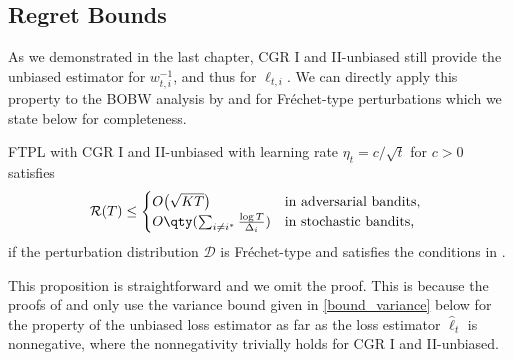 \subsection{Regret Bounds}
As we demonstrated in the last chapter, CGR I and II-unbiased still provide the unbiased estimator for $w_{t,i}^{-1}$, and thus for $\ell_{t,i}$.
We can directly apply this property to the BOBW analysis by \citet{pmlr-v201-honda23a} and \citet{pmlr-v247-lee24a}
for Fr\'{e}chet-type perturbations which we state below for completeness.
\begin{proposition}\label{prop_unbiased}
    FTPL with CGR I and II-unbiased with learning rate $\eta_t = c/\sqrt{t}$ for $c>0$ satisfies
\begin{align*}
\!\!\!
        \mathcal{R}(T) \leq \begin{cases}
            O\big(\sqrt{KT}\big)  &\text{in adversarial bandits,} \\
            O\qty(\sum_{i \ne i^*}\frac{\log T}{\Delta_i})& \text{in stochastic bandits,}
        \end{cases}
\end{align*}
if the perturbation distribution $\mathcal{D}$ is Fr\'echet-type and satisfies the conditions in \citet[Theorem 2]{pmlr-v247-lee24a}.
\end{proposition}
This proposition is straightforward and we omit the proof.
This is because the proofs
of \citet{pmlr-v201-honda23a} and \citet{pmlr-v247-lee24a}
only use the variance bound given in \eqref{bound_variance} below for the property of the unbiased loss estimator
as far as the loss estimator
$\hat{\ell}_t$ is nonnegative,
where the nonnegativity trivially holds for CGR I and II-unbiased.



